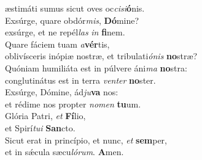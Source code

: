 \evenverse æstimáti sumus sicut oves oc\textit{ci}\textit{si}\textbf{ó}nis.\\
\oddverse Exsúrge, quare obdór\textit{mis}, \textbf{Dó}mine?~\*\\
\oddverse exsúrge, et ne repél\textit{las} \textit{in} \textbf{fi}nem.\\
\evenverse Quare fáciem tuam \textit{a}\textbf{vér}tis,~\*\\
\evenverse oblivísceris inópiæ nostræ, et tribulati\textit{ó}\textit{nis} \textbf{no}stræ?\\
\oddverse Quóniam humiliáta est in púlvere áni\textit{ma} \textbf{no}stra:~\*\\
\oddverse conglutinátus est in terra \textit{ven}\textit{ter} \textbf{no}ster.\\
\evenverse Exsúrge, Dómine, ád\textit{ju}\textbf{va} nos:~\*\\
\evenverse et rédime nos propter \textit{no}\textit{men} \textbf{tu}um.\\
\oddverse Glória Patri, \textit{et} \textbf{Fí}lio,~\*\\
\oddverse et Spirí\textit{tu}\textit{i} \textbf{San}cto.\\
\evenverse Sicut erat in princípio, et nunc, \textit{et} \textbf{sem}per,~\*\\
\evenverse et in sǽcula sæcu\textit{ló}\textit{rum}. \textbf{A}men.\\
